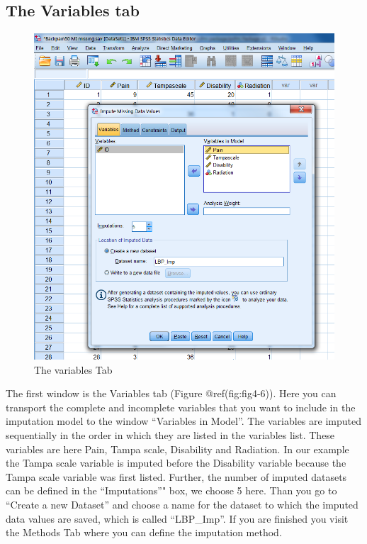 \documentclass[
]{book}
\begin{document}
\hypertarget{the-variables-tab}{%
\subsection{The Variables tab}\label{the-variables-tab}}

\begin{figure}

{\centering \includegraphics[width=0.9\linewidth]{images/fig4.6} 

}

\caption{The variables Tab}\label{fig:fig4-6}
\end{figure}

The first window is the Variables tab (Figure @ref(fig:fig4-6)). Here
you can transport the complete and incomplete variables that you want to
include in the imputation model to the window ``Variables in Model''.
The variables are imputed sequentially in the order in which they are
listed in the variables list. These variables are here Pain, Tampa
scale, Disability and Radiation. In our example the Tampa scale variable
is imputed before the Disability variable because the Tampa scale
variable was first listed. Further, the number of imputed datasets can
be defined in the ``Imputations''" box, we choose 5 here. Than you go to
``Create a new Dataset'' and choose a name for the dataset to which the
imputed data values are saved, which is called ``LBP\_Imp''. If you are
finished you visit the Methods Tab where you can define the imputation
method.
\end{document}
